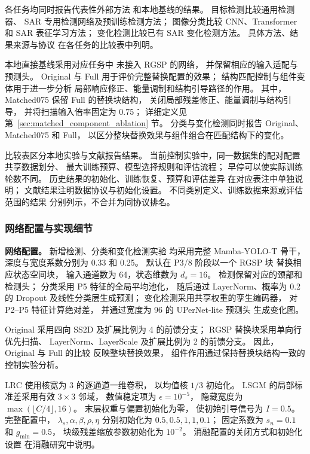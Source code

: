 \documentclass[journal]{IEEEtran}
\begin{document}
各任务均同时报告代表性外部方法
和本地基线的结果。
目标检测比较通用检测器、
SAR 专用检测网络及预训练检测方法；
图像分类比较 CNN、Transformer
和 SAR 表征学习方法；
变化检测比较已有 SAR 变化检测方法。
具体方法、结果来源与协议
在各任务的比较表中列明。

本地直接基线采用对应任务中
未接入 RGSP 的网络，
并保留相应的输入适配与预测头。
Original 与 Full 用于评价完整替换配置的效果；
结构匹配控制与组件变体用于进一步分析
局部响应修正、能量调制和结构引导路径的作用。
其中，Matched075 保留 Full 的替换块结构，
关闭局部残差修正、能量调制与结构引导，
并将扫描输入倍率固定为 0.75；
详细定义见第~\ref{sec:matched_component_ablation} 节。
分类与变化检测同时报告 Original、Matched075 和 Full，
以区分整块替换效果与组件组合在匹配结构下的变化。

比较表区分本地实验与文献报告结果。
当前控制实验中，同一数据集的配对配置共享数据划分、
最大训练预算、模型选择规则和评估流程；
早停可以使实际训练轮数不同。
历史结果的初始化、训练恢复、预算和评估差异
在对应表注中单独说明；
文献结果注明数据协议与初始化设置。
不同类别定义、训练数据来源或评估范围的结果
分别列示，不合并为同协议排名。

\subsubsection{网络配置与实现细节}
\label{sec:implementation_details}

\textbf{网络配置。}
新增检测、分类和变化检测实验
均采用完整 Mamba-YOLO-T 骨干，
深度与宽度系数分别为 0.33 和 0.25。
默认在 P3/8 阶段以一个 RGSP 块
替换相应状态空间块，
输入通道数为 64，状态维数为 $d_s=16$。
检测保留对应的颈部和检测头；
分类采用 P5 特征的全局平均池化，
随后通过 LayerNorm、概率为 0.2 的 Dropout
及线性分类层生成预测；
变化检测采用共享权重的孪生编码器，
对 P2--P5 特征计算绝对差，
并通过宽度为 96 的 UPerNet-lite 预测头
生成变化图。

Original 采用四向 SS2D
及扩展比例为 4 的前馈分支；
RGSP 替换块采用单向行优先扫描、
LayerNorm、LayerScale
及扩展比例为 2 的前馈分支。
因此，Original 与 Full 的比较
反映整块替换效果，
组件作用通过保持替换块结构一致的控制实验分析。

LRC 使用核宽为 3 的逐通道一维卷积，
以均值核 $1/3$ 初始化。
LSGM 的局部标准差采用有效 $3\times3$ 邻域，
数值稳定项为 $\epsilon=10^{-5}$，
隐藏宽度为 $\max(\lfloor C/4\rfloor,16)$。
末层权重与偏置初始化为零，
使初始引导信号为 $I=0.5$。
完整配置中，
$\lambda_s,\alpha,\beta,\rho,\eta$
分别初始化为 $0.5,0.5,1,1,0.1$；
固定系数为 $s_n=0.1$ 和 $g_{\min}=0.5$，
块级残差缩放参数初始化为 $10^{-2}$。
消融配置的关闭方式和初始化设置
在消融研究中说明。
\end{document}
